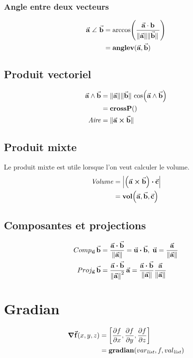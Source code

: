 \subsubsection{Angle entre deux vecteurs}
\centering
\begin{align*}
    \va{a} ~\angle~ \va{b} &= \arccos(\frac{\va{a}\cdot\vb{b}}{\norm{\va{a}}\norm*{\va{b}}})\\
    &= \mathbf{anglev}(\va{a},\va{b})
\end{align*}

\subsection{Produit vectoriel}
\begin{align*}
    \va{a} \wedge \va{b} &= \norm{\va{a}} \norm*{ \va{b} }\cos(\va{a}\wedge\va{b})\\
    &= \mathbf{crossP}()\\
    \mathit{Aire} &=  \norm*{\va{a} \cp \va{b}}
\end{align*}

\subsection{Produit mixte}
Le produit mixte est utile lorsque l'on veut calculer le volume.
\begin{align*}
    \mathit{Volume} &= \abs{\qty(\va{a} \cp\va{b}) \vdot \va{c}}\\
    &= \mathbf{vol}\qty(\va{a},\va{b},\va{c})
\end{align*}

\subsection{Composantes et projections}
\begin{align*}
    Comp_{\va{u}}\,\va{b} &= \frac{\va{a}\vdot\va{b}}{\norm{\va{a}}} = \va{u}\vdot \va{b} ,\; \va{u}=\frac{\va{a}}{\norm{\va{a}}}\\
    Proj_{\va{a}}\,\va{b} &= \frac{\va{a}\vdot\va{b}}{\norm{\va{a}}^2}\,\va{a} = \frac{\va{a}\vdot\va{b}}{\norm{\va{a}}}\frac{\va{a}}{\norm{\va{a}}}
\end{align*}

\section{Gradian}
\begin{align*}
    \grad{\va{f}}(x,y,z) &= \qty[\pdv{f}{x},\pdv{f}{y},\pdv{f}{z}]\\
    &= \mathbf{gradian}(var_{\mathit{list}},f,val_{\mathit{list}})
\end{align*}

